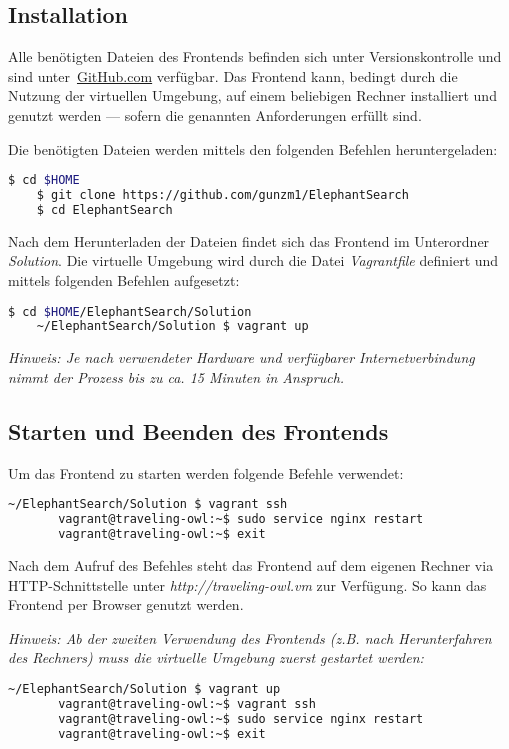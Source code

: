 \subsection{Installation}
\label{chap:anh:ihb:frontend:install}
Alle benötigten Dateien des Frontends befinden sich unter Versionskontrolle und sind unter~\href{https://github.com/gunzm1/ElephantSearch}{GitHub.com} verfügbar. Das Frontend kann, bedingt durch die Nutzung der virtuellen Umgebung, auf einem beliebigen Rechner installiert und genutzt werden --- sofern die genannten Anforderungen erfüllt sind.

Die benötigten Dateien werden mittels den folgenden Befehlen heruntergeladen:
\begin{lstlisting}[language=bash]
    $ cd $HOME
    $ git clone https://github.com/gunzm1/ElephantSearch
    $ cd ElephantSearch
\end{lstlisting}

Nach dem Herunterladen der Dateien findet sich das Frontend im Unterordner \textit{Solution}. Die virtuelle Umgebung wird durch die Datei \textit{Vagrantfile} definiert und mittels folgenden Befehlen aufgesetzt:
\begin{lstlisting}[language=bash]
                              $ cd $HOME/ElephantSearch/Solution
    ~/ElephantSearch/Solution $ vagrant up
\end{lstlisting}
\textit{Hinweis: Je nach verwendeter Hardware und verfügbarer Internetverbindung nimmt der Prozess bis zu ca. 15 Minuten in Anspruch.}

\subsection{Starten und Beenden des Frontends}
\label{chap:anh:ihb:frontend:start}
Um das Frontend zu starten werden folgende Befehle verwendet:
\begin{lstlisting}[language=bash]
    ~/ElephantSearch/Solution $ vagrant ssh
       vagrant@traveling-owl:~$ sudo service nginx restart
       vagrant@traveling-owl:~$ exit
\end{lstlisting}
Nach dem Aufruf des Befehles steht das Frontend auf dem eigenen Rechner via HTTP-Schnittstelle unter \textit{http://traveling-owl.vm} zur Verfügung. So kann das Frontend per Browser genutzt werden.

\textit{Hinweis: Ab der zweiten Verwendung des Frontends (z.B. nach Herunterfahren des Rechners) muss die virtuelle Umgebung zuerst gestartet werden:}
\begin{lstlisting}[language=bash]
    ~/ElephantSearch/Solution $ vagrant up
       vagrant@traveling-owl:~$ vagrant ssh
       vagrant@traveling-owl:~$ sudo service nginx restart
       vagrant@traveling-owl:~$ exit
\end{lstlisting}

